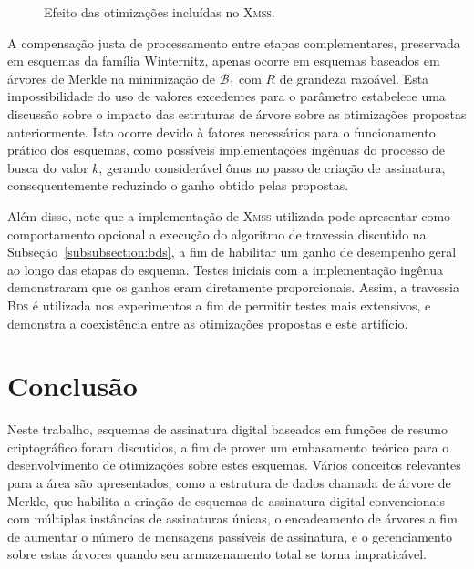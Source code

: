 \documentclass{ufsctex/ufsctex}
\newcommand{\bone}{\mathcal{B}_{1}}
\newcommand{\bds}{\textsc{Bds}}
\newcommand{\xmss}{\textsc{Xmss}}
\begin{document}
\begin{figure}
 \caption{Efeito das otimizações incluídas no
  \xmss{}.}\label{fig:xmssresults} \end{figure}

A compensação justa de processamento entre etapas complementares, preservada em
esquemas da família Winternitz, apenas ocorre em esquemas baseados em árvores
de Merkle na minimização de $\bone{}$ com $R$ de grandeza razoável. Esta
impossibilidade do uso de valores excedentes para o parâmetro estabelece uma
discussão sobre o impacto das estruturas de árvore sobre as otimizações
propostas anteriormente. Isto ocorre devido à fatores necessários para o
funcionamento prático dos esquemas, como possíveis implementações ingênuas do
processo de busca do valor $k$, gerando considerável ônus no passo de criação
de assinatura, consequentemente reduzindo o ganho obtido pelas propostas.

Além disso, note que a implementação de \xmss{} utilizada pode apresentar como
comportamento opcional a execução do algoritmo de travessia discutido na
Subseção~\ref{subsubsection:bds}, a fim de habilitar um ganho de desempenho
geral ao longo das etapas do esquema. Testes iniciais com a implementação
ingênua demonstraram que os ganhos eram diretamente proporcionais. Assim, a
travessia \bds{} é utilizada nos experimentos a fim de permitir testes mais
extensivos, e demonstra a coexistência entre as otimizações propostas e este
artifício.

\chapter{Conclusão}\label{chapter:conclusion}

Neste trabalho, esquemas de assinatura digital baseados em funções de resumo
criptográfico foram discutidos, a fim de prover um embasamento teórico para o
desenvolvimento de otimizações sobre estes esquemas. Vários conceitos
relevantes para a área são apresentados, como a estrutura de dados chamada de
árvore de Merkle, que habilita a criação de esquemas de assinatura digital
convencionais com múltiplas instâncias de assinaturas únicas, o encadeamento de
árvores a fim de aumentar o número de mensagens passíveis de assinatura, e o
gerenciamento sobre estas árvores quando seu armazenamento total se torna
impraticável.
\end{document}
